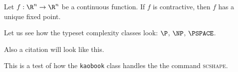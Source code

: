 \begin{theorem}\label{thm:fixed_point}
    Let $f: \R^n \to \R^n$ be a continuous function. If $f$ is
    contractive, then $f$ has a unique fixed point.
\end{theorem}
Let us see how the typeset complexity classes look: $\P$, $\NP$, $\PSPACE$.

Also a citation
 will look like this.

This is a test of how the \texttt{kaobook} class handles the the command
\textsc{scshape}.
